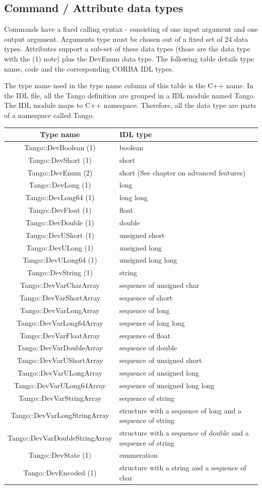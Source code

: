 \subsection{Command / Attribute data types}

Commands have a fixed calling syntax - consisting of one input argument
and one output argument. Arguments type must be chosen out of a fixed
set of 24 data types. Attributes support a sub-set of these data types
(those are the data type with the (1) note) plus the DevEnum data
type. The following table details type name, code and the corresponding
CORBA IDL types.

The type name used in the type name column of this table is the C++
name. In the IDL file, all the Tango definition are grouped in a IDL
module named Tango. The IDL module maps to C++ namespace.
Therefore, all the data type are parts of a namespace called Tango.

\vspace{0.3cm}

\begin{center}
\begin{longtable}{|c|l|}
\hline 
Type name & IDL type\tabularnewline
\hline 
\hline 
Tango::DevBoolean (1) & boolean\tabularnewline
\hline 
Tango::DevShort (1) & short\tabularnewline
\hline 
Tango::DevEnum (2) & short (See chapter on advanced features)\tabularnewline
\hline 
Tango::DevLong (1) & long\tabularnewline
\hline 
Tango::DevLong64 (1) & long long\tabularnewline
\hline 
Tango::DevFloat (1) & float\tabularnewline
\hline 
Tango::DevDouble (1) & double\tabularnewline
\hline 
Tango::DevUShort (1) & unsigned short\tabularnewline
\hline 
Tango::DevULong (1) & unsigned long\tabularnewline
\hline 
Tango::DevULong64 (1) & unsigned long long\tabularnewline
\hline 
Tango::DevString (1) & string\tabularnewline
\hline 
Tango::DevVarCharArray & sequence of unsigned char\tabularnewline
\hline 
Tango::DevVarShortArray & sequence of short\tabularnewline
\hline 
Tango::DevVarLongArray & sequence of long\tabularnewline
\hline 
Tango::DevVarLong64Array & sequence of long long\tabularnewline
\hline 
Tango::DevVarFloatArray & sequence of float\tabularnewline
\hline 
Tango::DevVarDoubleArray & sequence of double\tabularnewline
\hline 
Tango::DevVarUShortArray & sequence of unsigned short\tabularnewline
\hline 
Tango::DevVarULongArray & sequence of unsigned long\tabularnewline
\hline 
Tango::DevVarULong64Array & sequence of unsigned long long\tabularnewline
\hline 
Tango::DevVarStringArray & sequence of string\tabularnewline
\hline 
Tango::DevVarLongStringArray & structure with a sequence of long and a sequence of string\tabularnewline
\hline 
Tango::DevVarDoubleStringArray & structure with a sequence of double and a sequence of string\tabularnewline
\hline 
Tango::DevState (1) & enumeration\tabularnewline
\hline 
Tango::DevEncoded (1) & structure with a string and a sequence of char\tabularnewline
\hline 
\end{longtable}
\par\end{center}

